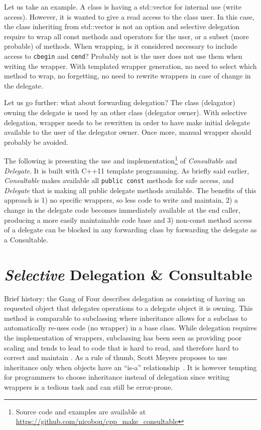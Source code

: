 \documentclass{article}
\begin{document}
Let us take an example. A class is having a std::vector for internal use (write access). However, it is wanted to give a read access to the class user. In this case, the class inheriting from std::vector is not an option and selective delegation require to wrap all const methods and operators for the user, or a subset (more probable) of methods. When wrapping, is it considered necessary to include access to \verb+cbegin+ and \verb+cend+? Probably not is the user does not use them when writing the wrapper. With templated wrapper generation, no need to select which method to wrap, no forgetting, no need to rewrite wrappers in case of change in the delegate.  

Let us go further: what about forwarding delegation? The class (delagator) owning the delegate is used by an other class (delegator owner). With selective delegation, wrapper needs to be rewritten in order to have make initial delegate available to the user of the delegator owner. Once more, manual wrapper should probably be avoided. 

The following is presenting the use and implementation\footnote{Source code and examples are available at\\ \url{https://github.com/nicobou/cpp_make_consultable}} of \textit{Consultable} and \textit{Delegate}. It is built with C++11 template programming. As briefly said earlier, \textit{Consultable} makes available all \verb+public const+ methods for safe access, and \textit{Delegate} that is making all public delegate methods available. The benefits of this approach is 1) no specific wrappers, so less code to write and maintain, 2) a change in the delegate code becomes immediately available at the end caller, producing a more easily maintainable code base and 3) non-const method access of a delegate can be blocked in any forwarding class by forwarding the delegate as a Consultable.

\section{\textit{Selective} Delegation \& Consultable}
Brief history: the Gang of Four\cite{1995gamma} describes delegation as consisting of having an requested object that delegates operations to a delegate object it is owning. This method is comparable to subclassing where inheritance allows for a subclass to automatically re-uses code (no wrapper) in a base class.  While delegation requires the implementation of wrappers, subclassing has been seen as providing poor scaling and tends to lead to code that is hard to read, and therefore hard to correct and maintain \cite{2007cser}. As a rule of thumb, Scott Meyers proposes to use inheritance only when objects have an ``is-a'' relationship~\cite{2005Meyers}. It is however tempting for programmers to choose inheritance instead of delegation since writing wrappers is a tedious task and can still be error-prone.
\end{document}
